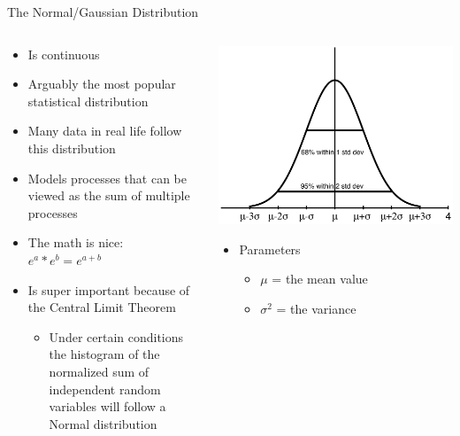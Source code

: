 \documentclass[aspectratio=169]{beamer}
\begin{document}
\begin{frame}{The Normal/Gaussian Distribution}

\begin{columns}
\begin{column}{0.5\textwidth}
\begin{itemize}
\item Is continuous
\item Arguably the most popular statistical distribution
\item Many data in real life follow this distribution
\item Models processes that can be viewed as the sum of multiple processes
\item The math is nice: $e^a * e^b = e^{a+b}$
\item Is super important because of the Central Limit Theorem
\begin{itemize}
	\item Under certain conditions the histogram of the normalized sum of independent random variables will follow a Normal distribution
\end{itemize}
\end{itemize}
\end{column}
\begin{column}{0.5\textwidth}
\includegraphics[width=1\textwidth]{lectModel1/normalPDF.pdf}
\begin{itemize}
\item Parameters
\begin{itemize}
\item $\mu$ = the mean value
\item $\sigma^2$ = the variance
\end{itemize}
\end{itemize}

\end{column}
\end{columns}
\end{frame}
\end{document}
